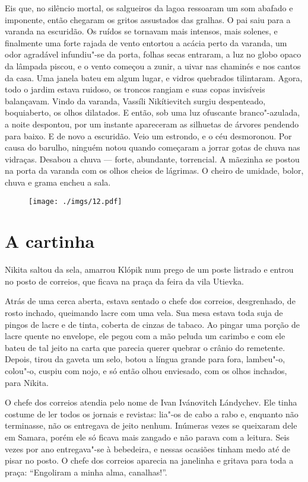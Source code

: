 Eis que, no silêncio mortal, os salgueiros da lagoa ressoaram um som
abafado e imponente, então chegaram os gritos assustados das gralhas. O
pai saiu para a varanda na escuridão. Os ruídos se tornavam mais
intensos, mais solenes, e finalmente uma forte rajada de vento entortou
a acácia perto da varanda, um odor agradável infundiu"-se da porta,
folhas secas entraram, a luz no globo opaco da lâmpada piscou, e o vento
começou a zunir, a uivar nas chaminés e nos cantos da casa. Uma janela
bateu em algum lugar, e vidros quebrados tilintaram. Agora, todo o
jardim estava ruidoso, os troncos rangiam e suas copas invisíveis
balançavam. Vindo da varanda, Vassíli Nikítievitch surgiu despenteado,
boquiaberto, os olhos dilatados. E então, sob uma luz ofuscante
branco"-azulada, a noite despontou, por um instante apareceram as
silhuetas de árvores pendendo para baixo. E de novo a escuridão. Veio um
estrondo, e o céu desmoronou. Por causa do barulho, ninguém notou quando
começaram a jorrar gotas de chuva nas vidraças. Desabou a chuva ---
forte, abundante, torrencial. A mãezinha se postou na porta da varanda
com os olhos cheios de lágrimas. O cheiro de umidade, bolor,
chuva e grama encheu a sala.

\begin{figure}
\vspace*{-2.1cm}
\hspace*{-2.5cm}\texttt{[image: ./imgs/12.pdf]}
\end{figure}

\chapter{A cartinha}

Nikita saltou da sela, amarrou Klópik num prego de um poste listrado e
entrou no posto de correios, que ficava na praça da feira da vila
Utievka.

Atrás de uma cerca aberta, estava sentado o chefe dos correios,
desgrenhado, de rosto inchado, queimando lacre com uma vela. Sua mesa
estava toda suja de pingos de lacre e de tinta, coberta de cinzas de
tabaco. Ao pingar uma porção de lacre quente no envelope, ele pegou com
a mão peluda um carimbo e com ele bateu de tal jeito na carta que
parecia querer quebrar o crânio do remetente. Depois, tirou da gaveta um
selo, botou a língua grande para fora, lambeu"-o, colou"-o, cuspiu com
nojo, e só então olhou enviesado, com os olhos inchados, para Nikita.

O chefe dos correios atendia pelo nome de Ivan Ivánovitch Lándychev. Ele
tinha costume de ler todos os jornais e revistas: lia"-os de cabo a rabo
e, enquanto não terminasse, não os entregava de jeito nenhum. Inúmeras
vezes se queixaram dele em Samara, porém ele só ficava mais zangado e
não parava com a leitura. Seis vezes por ano entregava"-se à bebedeira,
e nessas ocasiões tinham medo até de pisar no posto. O chefe dos
correios aparecia na janelinha e gritava para toda a praça: ``Engoliram
a minha alma, canalhas!''.

